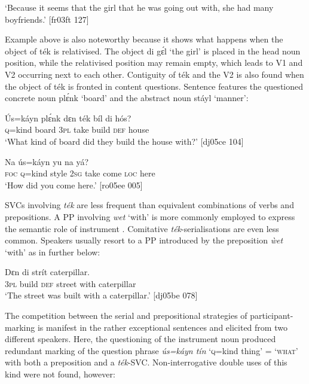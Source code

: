 \glt ‘Because it seems that the girl that he was going out with, she had many boyfriends.’
[fr03ft 127]
\z

Example  above is also noteworthy because it shows what happens when the object of ték is relativised. The object di gɛ́l ‘the girl’ is placed in the head noun position, while the relativised position may remain empty, which leads to V1 and V2 occurring next to each other. Contiguity of ték and the V2 is also found when the object of ték is fronted in content questions{\fff}. Sentence  features the questioned concrete noun plɛ́nk ‘board’ and  the abstract noun stáyl ‘manner’: 


\ea%
    \label{ex:key:1568}
    \gll \'{U}s=káyn  plɛ́nk  dɛn  ték    bíl    di  hós?\\
\textsc{q}=kind  board  \textsc{3pl}  take    build  \textsc{def}  house\\

\glt ‘What kind of board did they build the house with?’ [dj05ce 104]
\z


\ea%
    \label{ex:key:1569}
    \gll Na  ús=káyn    yu          na  yá?\\
\textsc{foc}  \textsc{q}=kind  style  \textsc{2sg}  take    come  \textsc{loc}  here\\

\glt ‘How did you come here.’ [ro05ee 005]
\z

SVCs involving \textit{ték} are less frequent than equivalent combinations of verbs and prepositions. A PP involving \textit{wet} ‘with’ is more commonly employed to express the semantic role of instrument\index{} . Comitative \textit{ték}{}-serialisations are even less common. Speakers usually resort to a PP introduced by the preposition\textit{ \`{w}et} ‘with’ as in  further below: 


\ea%
    \label{ex:key:1570}
    \gll Dɛn     di  strít        caterpillar.\\
\textsc{3pl}  build  \textsc{def}  street  with    caterpillar\\

\glt ‘The street was built with a caterpillar.’ [dj05be 078]
\z

The competition between the serial and prepositional strategies of participant-marking is manifest in the rather exceptional sentences  and  elicited from two different speakers. Here, the questioning of the instrument noun produced redundant marking of the question phrase \textit{ús=káyn tín} ‘\textsc{q}=kind thing’ = ‘\textsc{what’} with both a preposition and a \textit{ték}{}-SVC. Non-interrogative double uses of this kind were not found, however:


